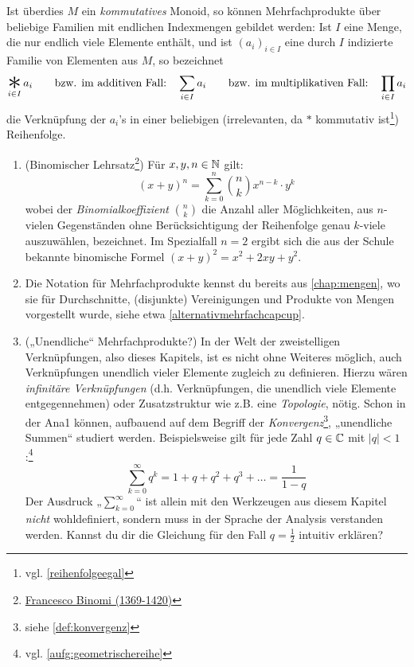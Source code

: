 \begin{nota}[Mehrfachprodukte]
    Ist überdies $M$ ein \emph{kommutatives} Monoid, so können Mehrfachprodukte über beliebige Familien mit endlichen Indexmengen gebildet werden: Ist $I$ eine Menge, die nur endlich viele Elemente enthält, und ist $(a_i)_{i\in I}$ eine durch $I$ indizierte Familie von Elementen aus $M$, so bezeichnet
        \[ \mathop{\raisebox{-0.6ex}{\scalebox{2.5}{$*$}}}_{i\in I} a_i \qquad\text{bzw. im additiven Fall:}\quad \sum_{i\in I} a_i \qquad\text{bzw. im multiplikativen Fall:}\quad \prod_{i\in I} a_i\]
    die Verknüpfung der $a_i$'s in einer beliebigen (irrelevanten, da $*$ kommutativ ist\footnote{vgl. \cref{reihenfolgeegal}}) Reihenfolge.
\end{nota}


\begin{bsp} \quad
    \begin{enumerate}
        \item(Binomischer Lehrsatz\footnote{\href{https://www.youtube.com/watch?v=462dkfAvlGo}{Francesco Binomi (1369-1420)}}) Für $x,y,n\in \mathbb N$ gilt:
            \[ (x+y)^n = \sum_{k=0}^n \binom{n}{k} x^{n-k}\cdot y^k \]
        wobei der \emph{Binomialkoeffizient} $\binom{n}{k}$ die Anzahl aller Möglichkeiten, aus $n$-vielen Gegenständen ohne Berücksichtigung der Reihenfolge genau $k$-viele auszuwählen, bezeichnet. Im Spezialfall $n=2$ ergibt sich die aus der Schule bekannte binomische Formel $(x+y)^2=x^2+2xy+y^2$.
        \item Die Notation für Mehrfachprodukte kennst du bereits aus \cref{chap:mengen}, wo sie für Durchschnitte, (disjunkte) Vereinigungen und Produkte von Mengen vorgestellt wurde, siehe etwa \cref{alternativmehrfachcapcup}.
        \item(„Unendliche“ Mehrfachprodukte?) In der Welt der zweistelligen Verknüpfungen, also dieses Kapitels, ist es nicht ohne Weiteres möglich, auch Verknüpfungen unendlich vieler Elemente zugleich zu definieren. Hierzu wären \emph{infinitäre Verknüpfungen} (d.h. Verknüpfungen, die unendlich viele Elemente entgegennehmen) oder Zusatzstruktur wie z.B. eine \emph{Topologie}, nötig. Schon in der Ana1 können, aufbauend auf dem Begriff der \emph{Konvergenz}\footnote{siehe \cref{def:konvergenz}}, „unendliche Summen“ studiert werden. Beispielsweise gilt für jede Zahl $q\in \mathbb C$ mit $\vert q\vert < 1$:\footnote{vgl. \cref{aufg:geometrischereihe}}
            \[ \sum_{k=0}^\infty q^k = 1 + q + q^2 + q^3 + \ldots = \frac{1}{1-q} \]
        Der Ausdruck „$\sum_{k=0}^\infty$“ ist allein mit den Werkzeugen aus diesem Kapitel \emph{nicht} wohldefiniert, sondern muss in der Sprache der Analysis verstanden werden. Kannst du dir die Gleichung für den Fall $q=\frac{1}{2}$ intuitiv erklären?
    \end{enumerate}
\end{bsp}





